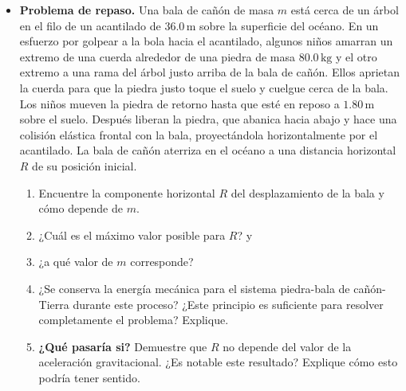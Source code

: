 \documentclass[11pt,a4paper]{article}
\begin{document}
\begin{itemize}
    \item[\textbf{48.}] \textbf{Problema de repaso.} Una bala de cañón de masa \(m\) está cerca de un árbol en el filo de un acantilado de \(36.0\,\text{m}\) sobre la superficie del océano. En un esfuerzo por golpear a la bola hacia el acantilado, algunos niños amarran un extremo de una cuerda alrededor de una piedra de masa \(80.0\,\text{kg}\) y el otro extremo a una rama del árbol justo arriba de la bala de cañón. Ellos aprietan la cuerda para que la piedra justo toque el suelo y cuelgue cerca de la bala. Los niños mueven la piedra de retorno hasta que esté en reposo a \(1.80\,\text{m}\) sobre el suelo. Después liberan la piedra, que abanica hacia abajo y hace una colisión elástica frontal con la bala, proyectándola horizontalmente por el acantilado. La bala de cañón aterriza en el océano a una distancia horizontal \(R\) de su posición inicial.
    \begin{enumerate}
        \item Encuentre la componente horizontal \(R\) del desplazamiento de la bala y cómo depende de \(m\).
        \item ¿Cuál es el máximo valor posible para \(R\)? y
        \item ¿a qué valor de \(m\) corresponde?
        \item ¿Se conserva la energía mecánica para el sistema piedra-bala de cañón-Tierra durante este proceso? ¿Este principio es suficiente para resolver completamente el problema? Explique.
        \item \textbf{¿Qué pasaría si?} Demuestre que \(R\) no depende del valor de la aceleración gravitacional. ¿Es notable este resultado? Explique cómo esto podría tener sentido.
    \end{enumerate}
    \vspace*{8cm}
\end{itemize}

\newpage
\end{document}
